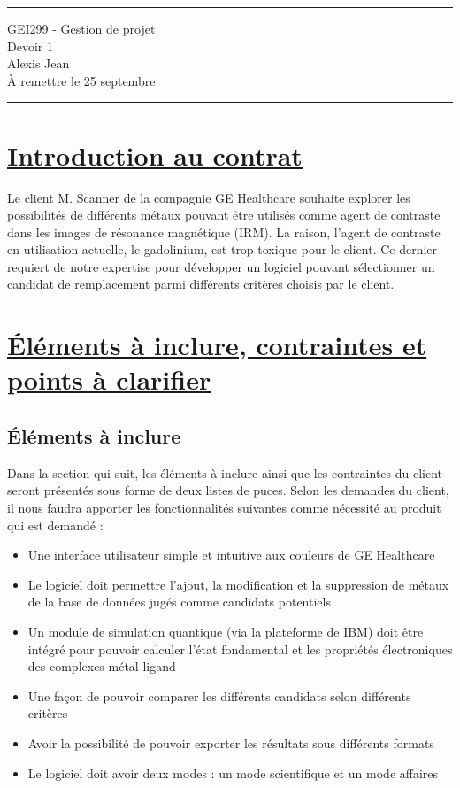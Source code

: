 \documentclass[11pt]{article}
\begin{document}
\hrule

\begin{center}
  {\Large GEI299 - Gestion de projet} \\ \vspace{5mm}
  {\LARGE\sffamily Devoir 1} \\
  Alexis Jean \\
  À remettre le 25 septembre
\end{center}

\hrule


\section{\underline{Introduction au contrat}}
Le client M. Scanner de la compagnie GE Healthcare souhaite explorer les possibilités de différents métaux pouvant être utilisés comme agent de contraste dans les images de résonance magnétique (IRM). La raison, l'agent de contraste en utilisation actuelle, le gadolinium, est trop toxique pour le client. Ce dernier requiert de notre expertise pour développer un logiciel pouvant sélectionner un candidat de remplacement parmi différents critères choisis par le client.


\section{\underline{Éléments à inclure, contraintes et points à clarifier}}

\subsection{Éléments à inclure}
Dans la section qui suit, les éléments à inclure ainsi que les contraintes du client seront présentés sous forme de deux listes de puces. Selon les demandes du client, il nous faudra apporter les fonctionnalités suivantes comme nécessité au produit qui est demandé :

\begin{itemize}[label=\textbullet]
  \item Une interface utilisateur simple et intuitive aux couleurs de GE Healthcare
  \item Le logiciel doit permettre l'ajout, la modification et la suppression de métaux de la base de données jugés comme candidats potentiels
  \item Un module de simulation quantique (via la plateforme de IBM) doit être intégré pour pouvoir calculer l’état fondamental et les propriétés électroniques des complexes métal-ligand
  \item Une façon de pouvoir comparer les différents candidats selon différents critères
  \item Avoir la possibilité de pouvoir exporter les résultats sous différents formats
  \item Le logiciel doit avoir deux modes : un mode scientifique et un mode affaires
\end{itemize}
\end{document}
